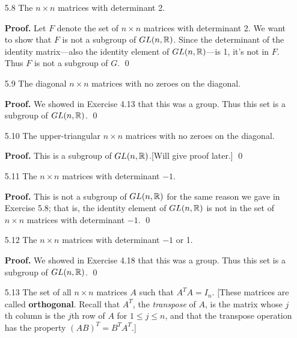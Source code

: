 \begin{enumerate}
   \item[5.8]  The $n \times n$ matrices with determinant 2.

      \textbf{Proof.} Let $F$ denote the set of $n \times n$ matrices with 
      determinant 2. We want to show that $F$ is not a subgroup of $GL(n, \mathbb{R})$. 
      Since the determinant of the identity matrix---also the identity element
      of $GL(n, \mathbb{R})$---is 1, it's not in $F$. Thus $F$ is not a subgroup of
      $G$. \qed
   \item[5.9]  The diagonal $n \times n$ matrices with no zeroes on the 
               diagonal.

      \textbf{Proof.} We showed in Exercise 4.13 that this was a group. Thus 
      this set is a subgroup of $GL(n, \mathbb{R})$. \qed
   \item[5.10] The upper-triangular $n \times n$ matrices with no zeroes on the
               diagonal.
   
      \textbf{Proof.} This is a subgroup of $GL(n, \mathbb{R})$.[Will give proof later.]
      \qed
   \item[5.11] The $n \times n$ matrices with determinant $-1$.

      \textbf{Proof.} This is not a subgroup of $GL(n, \mathbb{R})$ for the same reason
      we gave in Exercise 5.8; that is, the identity element of $GL(n, \mathbb{R})$ is
      not in the set of $n \times n$ matrices with determinant $-1$. \qed
   \item[5.12] The $n \times n$ matrices with determinant $-1$ or 1.

      \textbf{Proof.} We showed in Exercise 4.18 that this was a group. Thus 
      this set is a subgroup of $GL(n, \mathbb{R})$. \qed
   \item[5.13] The set of all $n \times n$ matrices $A$ such that
               $A^TA = I_n$. [These matrices are called \textbf{orthogonal}.
               Recall that $A^T$, the \textit{transpose} of $A$, is the matrix
               whose $j$th column is the $j$th row of $A$ for $1 \le j \le n$,
               and that the transpose operation has the property
               $(AB)^T = B^TA^T$.]


\end{enumerate}
